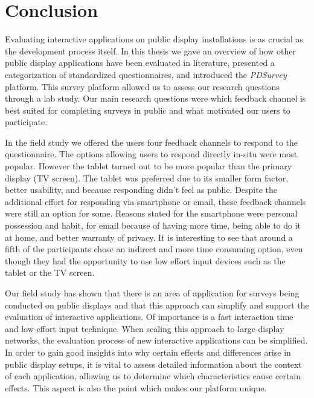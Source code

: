 \section{Conclusion}
\label{chapter:conclusion}

	Evaluating interactive applications on public display installations is as crucial as the development process itself. In this thesis we gave an overview of how other public display applications have been evaluated in literature, presented a categorization of standardized questionnaires, and introduced the \textit{PDSurvey} platform. This survey platform allowed us to assess our research questions through a lab study. Our main research questions were which feedback channel is best suited for completing surveys in public and what motivated our users to participate. 

	In the field study we offered the users four feedback channels to respond to the questionnaire. The options allowing users to respond directly in-situ were most popular. However the tablet turned out to be more popular than the primary display (TV screen). The tablet was preferred due to its smaller form factor, better usability, and because responding didn't feel as public. Despite the additional effort for responding via smartphone or email, these feedback channels were still an option for some. Reasons stated for the smartphone were personal possession and habit, for email because of having more time, being able to do it at home, and better warranty of privacy. It is interesting to see that around a fifth of the participants chose an indirect and more time consuming option, even though they had the opportunity to use low effort input devices such as the tablet or the TV screen.

	Our field study has shown that there is an area of application for surveys being conducted on public displays and that this approach can simplify and support the evaluation of interactive applications. Of importance is a fast interaction time and low-effort input technique. When scaling this approach to large display networks, the evaluation process of new interactive applications can be simplified. In order to gain good insights into why certain effects and differences arise in public display setups, it is vital to assess detailed information about the context of each application, allowing us to determine which characteristics cause certain effects. This aspect is also the point which makes our platform unique. 

